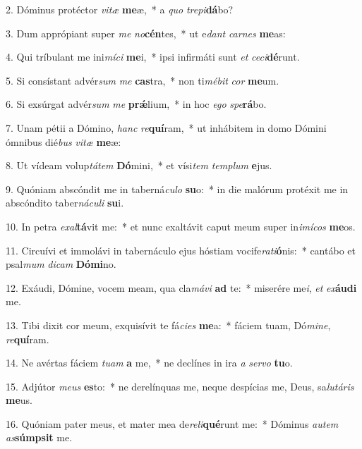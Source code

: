 2. Dóminus protéctor \textit{vi}\textit{tæ} \textbf{me}æ,~*  a \textit{quo} \textit{tre}\textit{pi}\textbf{dá}bo?\

3. Dum apprópiant super \textit{me} \textit{no}\textbf{cén}tes,~*  ut e\textit{dant} \textit{car}\textit{nes} \textbf{me}as:\

4. Qui tríbulant me ini\textit{mí}\textit{ci} \textbf{me}i,~*  ipsi infirmáti sunt \textit{et} \textit{ce}\textit{ci}\textbf{dé}runt.\

5. Si consístant advér\textit{sum} \textit{me} \textbf{cas}tra,~*  non ti\textit{mé}\textit{bit} \textit{cor} \textbf{me}um.\

6. Si exsúrgat advér\textit{sum} \textit{me} \textbf{prǽ}lium,~*  in hoc \textit{e}\textit{go} \textit{spe}\textbf{rá}bo.\

7. Unam pétii a Dómino, \textit{hanc} \textit{re}\textbf{quí}ram,~*  ut inhábitem in domo Dómini ómnibus dié\textit{bus} \textit{vi}\textit{tæ} \textbf{me}æ:\

8. Ut vídeam volup\textit{tá}\textit{tem} \textbf{Dó}mini,~*  et vísi\textit{tem} \textit{tem}\textit{plum} \textbf{e}jus.\

9. Quóniam abscóndit me in taberná\textit{cu}\textit{lo} \textbf{su}o:~*  in die malórum protéxit me in abscóndito taber\textit{ná}\textit{cu}\textit{li} \textbf{su}i.\

10. In petra \textit{ex}\textit{al}\textbf{tá}vit me:~*  et nunc exaltávit caput meum super in\textit{i}\textit{mí}\textit{cos} \textbf{me}os.\

11. Circuívi et immolávi in tabernáculo ejus hóstiam vocife\textit{ra}\textit{ti}\textbf{ó}nis:~*  cantábo et psal\textit{mum} \textit{di}\textit{cam} \textbf{Dó}\textbf{mi}no.\

12. Exáudi, Dómine, vocem meam, qua cla\textit{má}\textit{vi} \textbf{ad} te:~*  miserére me\textit{i}, \textit{et} \textit{ex}\textbf{áu}\textbf{di} me.\

13. Tibi dixit cor meum, exquisívit te fá\textit{ci}\textit{es} \textbf{me}a:~*  fáciem tuam, Dó\textit{mi}\textit{ne}, \textit{re}\textbf{quí}ram.\

14. Ne avértas fáciem \textit{tu}\textit{am} \textbf{a} me,~*  ne declínes in ira \textit{a} \textit{ser}\textit{vo} \textbf{tu}o.\

15. Adjútor \textit{me}\textit{us} \textbf{es}to:~*  ne derelínquas me, neque despícias me, Deus, sa\textit{lu}\textit{tá}\textit{ris} \textbf{me}us.\

16. Quóniam pater meus, et mater mea de\textit{re}\textit{li}\textbf{qué}runt me:~*  Dóminus \textit{au}\textit{tem} \textit{as}\textbf{súmp}\textbf{sit} me.\

